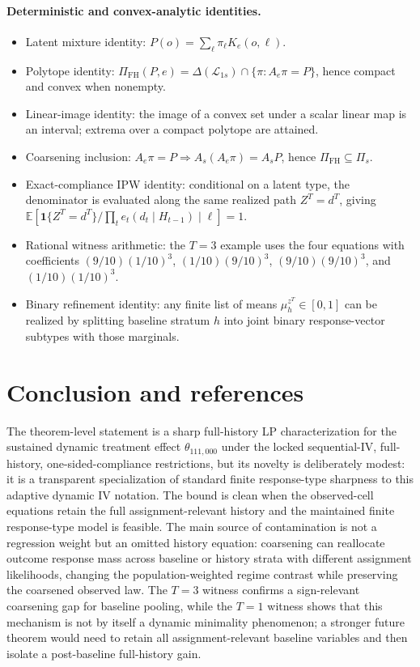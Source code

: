 \documentclass[11pt]{article}
\newcommand{\E}{\mathbb{E}}
\newcommand{\one}{\mathbf{1}}
\theoremstyle{definition}
\theoremstyle{plain}
\theoremstyle{remark}
\begin{document}
\paragraph{Deterministic and convex-analytic identities.}
\begin{itemize}[leftmargin=*]
\item Latent mixture identity: \(P(o)=\sum_\ell\pi_\ell K_e(o,\ell)\).
\item Polytope identity: \(\Pi_{\mathrm{FH}}(P,e)=\Delta(\mathcal L_{1s})\cap\{\pi:A_e\pi=P\}\), hence compact and convex when nonempty.
\item Linear-image identity: the image of a convex set under a scalar linear map is an interval; extrema over a compact polytope are attained.
\item Coarsening inclusion: \(A_e\pi=P\Rightarrow A_s(A_e\pi)=A_sP\), hence \(\Pi_{\mathrm{FH}}\subseteq\Pi_s\).
\item Exact-compliance IPW identity: conditional on a latent type, the denominator is evaluated along the same realized path \(Z^T=d^T\), giving \(\E[\one\{Z^T=d^T\}/\prod_t e_t(d_t\mid H_{t-1})\mid\ell]=1\).
\item Rational witness arithmetic: the \(T=3\) example uses the four equations with coefficients \((9/10)(1/10)^3\), \((1/10)(9/10)^3\), \((9/10)(9/10)^3\), and \((1/10)(1/10)^3\).
\item Binary refinement identity: any finite list of means \(\mu_h^{z^T}\in[0,1]\) can be realized by splitting baseline stratum \(h\) into joint binary response-vector subtypes with those marginals.
\end{itemize}

\section{Conclusion and references}
The theorem-level statement is a sharp full-history LP characterization for the sustained dynamic treatment effect \(\theta_{111,000}\) under the locked sequential-IV, full-history, one-sided-compliance restrictions, but its novelty is deliberately modest: it is a transparent specialization of standard finite response-type sharpness to this adaptive dynamic IV notation.  The bound is clean when the observed-cell equations retain the full assignment-relevant history and the maintained finite response-type model is feasible.  The main source of contamination is not a regression weight but an omitted history equation: coarsening can reallocate outcome response mass across baseline or history strata with different assignment likelihoods, changing the population-weighted regime contrast while preserving the coarsened observed law.  The \(T=3\) witness confirms a sign-relevant coarsening gap for baseline pooling, while the \(T=1\) witness shows that this mechanism is not by itself a dynamic minimality phenomenon; a stronger future theorem would need to retain all assignment-relevant baseline variables and then isolate a post-baseline full-history gain.
\end{document}
